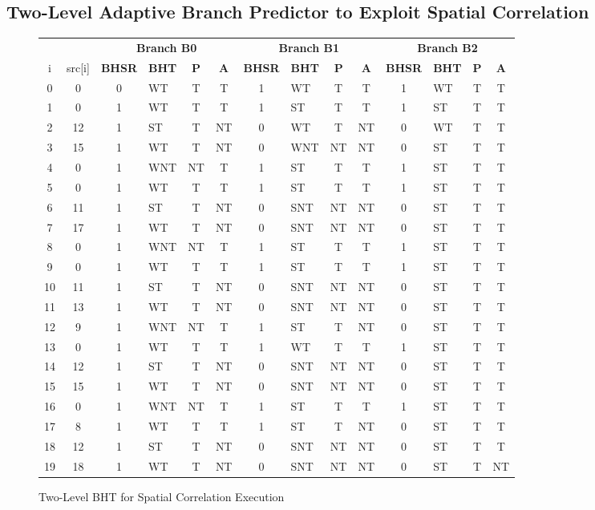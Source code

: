 \documentclass[10pt]{article}
\begin{document}
\subsection{Two-Level Adaptive Branch Predictor to Exploit Spatial Correlation}

\begin{figure}[H]
\centering
{\setlength{\tabcolsep}{3pt}
\begin{tabular}{@{\extracolsep{3pt}}ccclccclccclcc@{}}
\hline
& & \multicolumn{4}{c}{\textbf{Branch B0}} & \multicolumn{4}{c}{\textbf{Branch B1}} & \multicolumn{4}{c}{\textbf{Branch B2}}\\
\cline{3-6}
\cline{7-10}
\cline{11-14}
i & src[i] & \textbf{BHSR} & \textbf{BHT} & \textbf{P} & \textbf{A} & \textbf{BHSR} & \textbf{BHT} & \textbf{P} & \textbf{A} & \textbf{BHSR} & \textbf{BHT} & \textbf{P} & \textbf{A} \\ \hline
0 & 0 & 0  & WT& T & T & 1  & WT& T & T & 1  & WT& T & T \\ \hline
1 & 0 & 1  & WT& T & T & 1  & ST& T & T & 1  & ST& T & T \\ \hline
2 & 12& 1  & ST& T & NT& 0  & WT& T & NT& 0  & WT& T & T \\ \hline
3 & 15& 1  & WT& T & NT& 0  &WNT& NT& NT& 0  & ST& T & T \\ \hline
4 & 0 & 1  &WNT& NT& T & 1  & ST& T & T & 1  & ST& T & T \\ \hline
5 & 0 & 1  & WT& T & T & 1  & ST& T & T & 1  & ST& T & T \\ \hline
6 & 11& 1  & ST& T & NT& 0  &SNT& NT& NT& 0  & ST& T & T \\ \hline
7 & 17& 1  & WT& T & NT& 0  &SNT& NT& NT& 0  & ST& T & T \\ \hline
8 & 0 & 1  &WNT& NT& T & 1  & ST& T & T & 1  & ST& T & T \\ \hline
9 & 0 & 1  & WT& T & T & 1  & ST& T & T & 1  & ST& T & T \\ \hline
10& 11& 1  & ST& T & NT& 0  &SNT& NT& NT& 0  & ST& T & T \\ \hline
11& 13& 1  & WT& T & NT& 0  &SNT& NT& NT& 0  & ST& T & T \\ \hline
12& 9 & 1  &WNT& NT& T & 1  & ST& T & NT& 0  & ST& T & T \\ \hline
13& 0 & 1  & WT& T & T & 1  & WT& T & T & 1  & ST& T & T \\ \hline
14& 12& 1  & ST& T & NT& 0  &SNT& NT& NT& 0  & ST& T & T \\ \hline
15& 15& 1  & WT& T & NT& 0  &SNT& NT& NT& 0  & ST& T & T \\ \hline
16& 0 & 1  &WNT& NT& T & 1  & ST& T & T & 1  & ST& T & T \\ \hline
17& 8 & 1  & WT& T & T & 1  & ST& T & NT& 0  & ST& T & T \\ \hline
18& 12& 1  & ST& T & NT& 0  &SNT& NT& NT& 0  & ST& T & T \\ \hline
19& 18& 1  & WT& T & NT& 0  &SNT& NT& NT& 0  & ST& T & NT\\ \hline
\end{tabular}
}
\caption{Two-Level BHT for Spatial Correlation Execution}
\end{figure}
\end{document}
